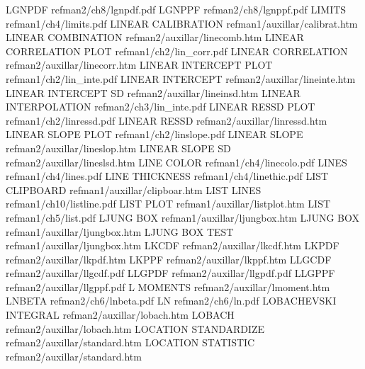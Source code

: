 LGNPDF                                  refman2/ch8/lgnpdf.pdf
LGNPPF                                  refman2/ch8/lgnppf.pdf
LIMITS                                  refman1/ch4/limits.pdf
LINEAR CALIBRATION                      refman1/auxillar/calibrat.htm
LINEAR COMBINATION                      refman2/auxillar/linecomb.htm
LINEAR CORRELATION PLOT                 refman1/ch2/lin_corr.pdf
LINEAR CORRELATION                      refman2/auxillar/linecorr.htm
LINEAR INTERCEPT PLOT                   refman1/ch2/lin_inte.pdf
LINEAR INTERCEPT                        refman2/auxillar/lineinte.htm
LINEAR INTERCEPT SD                     refman2/auxillar/lineinsd.htm
LINEAR INTERPOLATION                    refman2/ch3/lin_inte.pdf
LINEAR RESSD PLOT                       refman1/ch2/linressd.pdf
LINEAR RESSD                            refman2/auxillar/linressd.htm
LINEAR SLOPE PLOT                       refman1/ch2/linslope.pdf
LINEAR SLOPE                            refman2/auxillar/lineslop.htm
LINEAR SLOPE SD                         refman2/auxillar/lineslsd.htm
LINE COLOR                              refman1/ch4/linecolo.pdf
LINES                                   refman1/ch4/lines.pdf
LINE THICKNESS                          refman1/ch4/linethic.pdf
LIST CLIPBOARD                          refman1/auxillar/clipboar.htm
LIST LINES                              refman1/ch10/listline.pdf
LIST PLOT                               refman1/auxillar/listplot.htm
LIST                                    refman1/ch5/list.pdf
LJUNG BOX                               refman1/auxillar/ljungbox.htm
LJUNG BOX                               refman1/auxillar/ljungbox.htm
LJUNG BOX TEST                          refman1/auxillar/ljungbox.htm
LKCDF                                   refman2/auxillar/lkcdf.htm
LKPDF                                   refman2/auxillar/lkpdf.htm
LKPPF                                   refman2/auxillar/lkppf.htm
LLGCDF                                  refman2/auxillar/llgcdf.pdf
LLGPDF                                  refman2/auxillar/llgpdf.pdf
LLGPPF                                  refman2/auxillar/llgppf.pdf
L MOMENTS                               refman2/auxillar/lmoment.htm
LNBETA                                  refman2/ch6/lnbeta.pdf
LN                                      refman2/ch6/ln.pdf
LOBACHEVSKI INTEGRAL                    refman2/auxillar/lobach.htm
LOBACH                                  refman2/auxillar/lobach.htm
LOCATION STANDARDIZE                    refman2/auxillar/standard.htm
LOCATION STATISTIC                      refman2/auxillar/standard.htm
